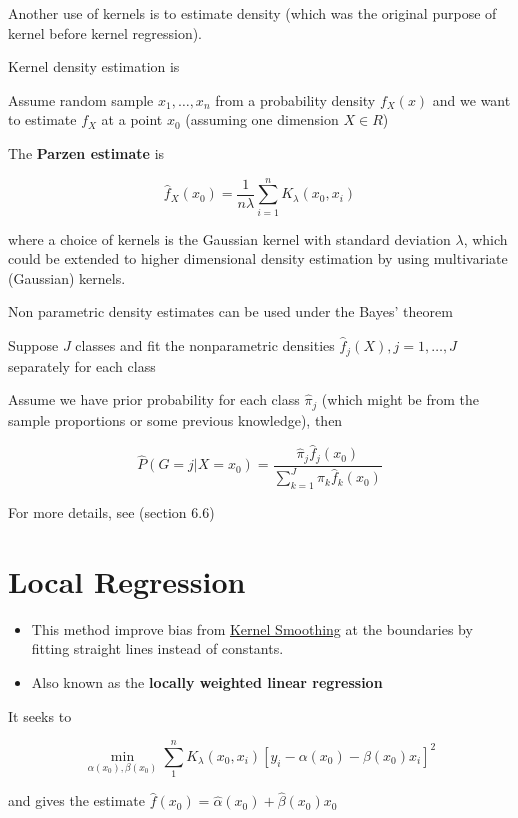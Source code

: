 \documentclass[
]{book}
\begin{document}
Another use of kernels is to estimate density (which was the original purpose of kernel before kernel regression).

Kernel density estimation is

Assume random sample \(x_1, \dots, x_n\) from a probability density \(f_X(x)\) and we want to estimate \(f_X\) at a point \(x_0\) (assuming one dimension \(X \in R\))

The \textbf{Parzen estimate} is

\[
\hat{f}_X(x_0) = \frac{1}{n \lambda}\sum_{i=1}^n K_\lambda (x_0, x_i)
\]

where a choice of kernels is the Gaussian kernel with standard deviation \(\lambda\), which could be extended to higher dimensional density estimation by using multivariate (Gaussian) kernels.

Non parametric density estimates can be used under the Bayes' theorem

Suppose \(J\) classes and fit the nonparametric densities \(\hat{f}_j (X), j = 1, \dots, J\) separately for each class

Assume we have prior probability for each class \(\hat{\pi}_j\) (which might be from the sample proportions or some previous knowledge), then

\[
\hat{P}(G=j | X=x_0) = \frac{\hat{\pi}_j \hat{f}_j (x_0)}{\sum_{k=1}^J \hat{\pi}_k \hat{f}_k (x_0)}
\]

For more details, see \citet{hastie2001a} (section 6.6)

\hypertarget{local-regression}{%
\chapter{Local Regression}\label{local-regression}}

\begin{itemize}
\item
  This method improve bias from \protect\hyperlink{kernel-smoothing}{Kernel Smoothing} at the boundaries by fitting straight lines instead of constants.
\item
  Also known as the \textbf{locally weighted linear regression}
\end{itemize}

It seeks to

\[
\min_{\alpha(x_0), \beta(x_0)} \sum_{1}^n K_\lambda (x_0, x_i)[y_i - \alpha (x_0) - \beta(x_0)x_i]^2
\]

and gives the estimate \(\hat{f}(x_0) =\hat{\alpha}(x_0)+ \hat{\beta}(x_0)x_0\)
\end{document}
